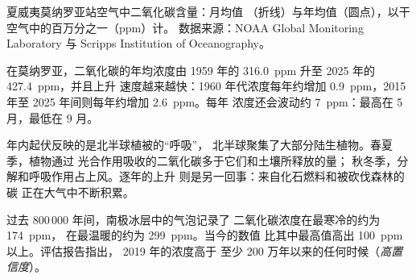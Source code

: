 \begin{omfigure}

{\small 夏威夷莫纳罗亚站空气中二氧化碳含量：月均值
（折线）与年均值（圆点），以干空气中的百万分之一（ppm）计。
数据来源：NOAA Global Monitoring Laboratory 与 Scripps Institution of
Oceanography。}
\end{omfigure}

\begin{proposition}[二氧化碳记录]\label{prop:g12:climate-change:co2}
在莫纳罗亚，二氧化碳的年均浓度由
1959 年的 \qty{316.0}{ppm} 升至 2025 年的 \qty{427.4}{ppm}，并且上升
速度越来越快：1960 年代浓度每年约增加
\qty{0.9}{ppm}，2015 年至 2025 年间则每年约增加 \qty{2.6}{ppm}。每年
浓度还会波动约 \qty{7}{ppm}：最高在
5 月，最低在 9 月。
\end{proposition}

\begin{remark}[曲线为何呈锯齿状]\label{rem:g12:climate-change:teeth}
年内起伏反映的是北半球植被的“呼吸”，
北半球聚集了大部分陆生植物。春夏季，植物通过
光合作用吸收的二氧化碳多于它们和土壤所释放的量；
秋冬季，分解和呼吸作用占上风。逐年的上升
则是另一回事：来自化石燃料和被砍伐森林的碳
正在大气中不断积累。
\end{remark}

\begin{proposition}\label{prop:g12:climate-change:icecore}
过去 800\,000 年间，南极冰层中的气泡记录了
二氧化碳浓度在最寒冷的约为 \qty{174}{ppm}，
在最温暖的约为 \qty{299}{ppm}。当今的数值
比其中最高值高出 \qty{100}{ppm} 以上。评估报告指出，
2019 年的浓度高于
至少 200 万年以来的任何时候（\emph{高置信度}）。
\end{proposition}

